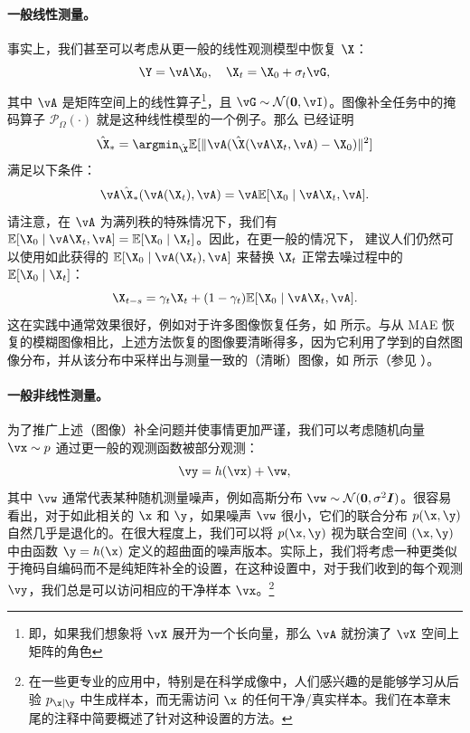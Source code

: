 \documentclass[../../book-main_zh.tex]{subfiles}
\begin{document}
\paragraph{一般线性测量。}
事实上，我们甚至可以考虑从更一般的线性观测模型中恢复 $\X$：
\begin{equation}
    \Y = \vA\X_0,  \quad \X_t = \X_0 + \sigma_t \vG,
\end{equation}
其中 $\vA$ 是矩阵空间上的线性算子\footnote{即，如果我们想象将 \(\vX\) 展开为一个长向量，那么 \(\vA\) 就扮演了 \(\vX\) 空间上矩阵的角色}，且 $\vG \sim
\mathcal{N}(\boldsymbol{0}, \vI)$。图像补全任务中的掩码算子 $\mathcal{P}_{\Omega}(\cdot)$ 就是这种线性模型的一个例子。那么 \cite{daras2023ambient} 已经证明
\begin{equation}
    \hat{\X}_* = \argmin_{\hat{\X}}
    \mathbb{E}[\|\vA(\hat{\X}(\vA\X_t, \vA) - \X_0)\|^2]
\end{equation}
满足以下条件：
\begin{equation}
    \vA \hat{\X}_*(\vA(\X_t), \vA) = \vA \mathbb{E}[\X_0 \mid \vA \X_t, \vA].
\end{equation} 请注意，在 $\vA$ 为满列秩的特殊情况下，我们有 $ \mathbb{E}[\X_0 \mid \vA\X_t, \vA] =
\mathbb{E}[\X_0 \mid \X_t]$。因此，在更一般的情况下，\cite{daras2023ambient} 建议人们仍然可以使用如此获得的 $\mathbb{E}[\X_0 \mid \vA(\X_t), \vA]$ 来替换 $\X_t$ 正常去噪过程中的 $\mathbb{E}[\X_0 \mid \X_t]$：
\begin{equation}
    \X_{t-s} = \gamma_t \X_t + (1-\gamma_t) \mathbb{E}[\X_0 \mid \vA\X_t, \vA].
\end{equation}
这在实践中通常效果很好，例如对于许多图像恢复任务，如 \cite{daras2023ambient} 所示。与从 MAE 恢复的模糊图像相比，上述方法恢复的图像要清晰得多，因为它利用了学到的自然图像分布，并从该分布中采样出与测量一致的（清晰）图像，如  所示（参见 ）。

\paragraph{一般非线性测量。}
为了推广上述（图像）补全问题并使事情更加严谨，我们可以考虑随机向量 $\vx \sim p$ 通过更一般的观测函数被部分观测：
\begin{equation}\label{eq:measurement-matching-observation}
    \vy = h(\vx) + \vw,
\end{equation}
其中 $\vw$ 通常代表某种随机测量噪声，例如高斯分布 $\vw \sim \mathcal{N}(\mathbf{0}, \sigma^2
\boldsymbol{I})$。很容易看出，对于如此相关的 $\x$ 和 $\y$，如果噪声 $\vw$ 很小，它们的联合分布 $p(\x, \y)$ 自然几乎是退化的。在很大程度上，我们可以将 $p(\x, \y)$ 视为联合空间 $(\x, \y)$ 中由函数 $\y = h(\x)$ 定义的超曲面的噪声版本。实际上，我们将考虑一种更类似于掩码自编码而不是纯矩阵补全的设置，在这种设置中，对于我们收到的每个观测 $\vy$，我们总是可以访问相应的干净样本 $\vx$。\footnote{在一些更专业的应用中，特别是在科学成像中，人们感兴趣的是能够学习从后验 $p_{\x \mid \y}$ 中生成样本，而无需访问 $\x$ 的任何干净/真实样本。我们在本章末尾的注释中简要概述了针对这种设置的方法。}
\end{document}
